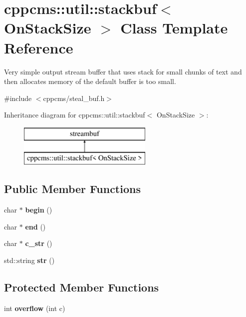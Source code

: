 \section{cppcms\-:\-:util\-:\-:stackbuf$<$ \-On\-Stack\-Size $>$ \-Class \-Template \-Reference}
\label{classcppcms_1_1util_1_1stackbuf}


\-Very simple output stream buffer that uses stack for small chunks of text and then allocates memory of the default buffer is too small.  




{\ttfamily \#include $<$cppcms/steal\-\_\-buf.\-h$>$}

\-Inheritance diagram for cppcms\-:\-:util\-:\-:stackbuf$<$ \-On\-Stack\-Size $>$\-:\begin{figure}[H]
\begin{center}
\leavevmode
\includegraphics[height=2.000000cm]{classcppcms_1_1util_1_1stackbuf}
\end{center}
\end{figure}
\subsection*{\-Public \-Member \-Functions}
\begin{DoxyCompactItemize}
\item 
char $\ast$ {\bf begin} ()
\item 
char $\ast$ {\bf end} ()
\item 
char $\ast$ {\bf c\-\_\-str} ()
\item 
std\-::string {\bf str} ()
\end{DoxyCompactItemize}
\subsection*{\-Protected \-Member \-Functions}
\begin{DoxyCompactItemize}
\item 
int {\bfseries overflow} (int c)\label{classcppcms_1_1util_1_1stackbuf_a52cd01fae4eae067e0363a21814afebb}

\end{DoxyCompactItemize}


